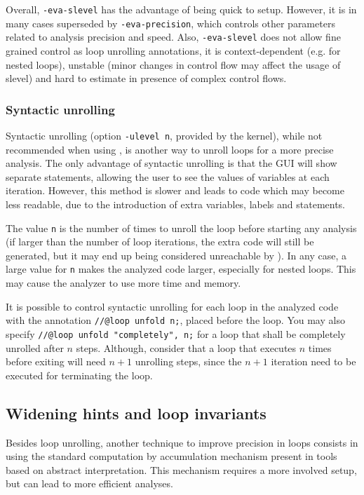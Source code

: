 \documentclass{frama-c-book}
\begin{document}
Overall, \lstinline|-eva-slevel| has the advantage of being quick to setup.
However, it is in many cases superseded by \lstinline|-eva-precision|, which
controls other parameters related to analysis precision and speed.
Also, \lstinline|-eva-slevel| does not allow fine grained control as
loop unrolling annotations,
it is context-dependent (e.g. for nested loops), unstable (minor changes in
control flow may affect the usage of slevel) and hard to estimate in presence
of complex control flows.

\subsubsection{Syntactic unrolling}

Syntactic unrolling (option \lstinline|-ulevel n|, provided by the \FramaC
kernel), while not recommended when using \Eva{}, is another way to unroll
loops for a more precise analysis. The only advantage of syntactic unrolling
is that the GUI will show separate statements, allowing
the user to see the values of variables at each iteration.
However, this method is slower and leads to code which may become less
readable, due to the introduction of extra variables, labels and statements.

The value \lstinline$n$ is the number of times to unroll the loop before starting
any analysis (if larger than the number of loop iterations, the extra code will
still be generated, but it may end up being considered unreachable by \Eva{}).
In any case, a large value for \lstinline|n| makes the analyzed code larger,
especially for nested loops. This may cause the analyzer to use more time and
memory.

It is possible to control syntactic unrolling for each loop in the analyzed code
with the annotation \lstinline|//@loop unfold n;|, placed before the loop.
You may also specify \lstinline|//@loop unfold "completely", n;| for a loop
that shall be completely unrolled after $n$ steps. Although, consider that
a loop that executes $n$ times before exiting will need $n+1$ unrolling steps,
since the $n+1$ iteration need to be executed for terminating the loop.

\subsection{Widening hints and loop invariants}

Besides loop unrolling, another technique to improve precision in loops
consists in using the standard computation by accumulation mechanism present in
tools based on abstract interpretation. This mechanism requires a more involved
setup, but can lead to more efficient analyses.
\end{document}
